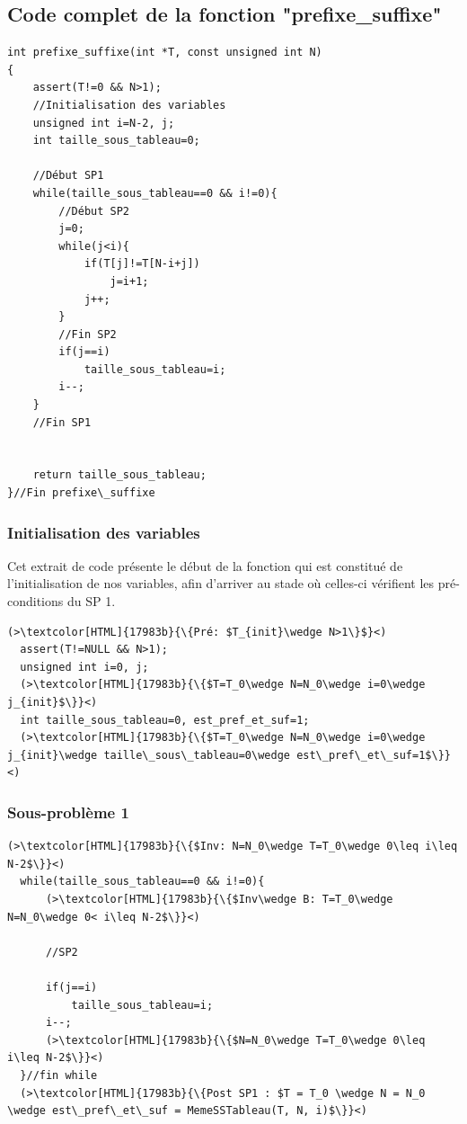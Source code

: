 \documentclass[a4paper, 11pt, oneside]{article}
\begin{document}
\subsection{Code complet de la fonction "prefixe\_suffixe"}
\begin{lstlisting}[caption={Code complet de la fonction "prefixe\_suffixe"}]
 int prefixe_suffixe(int *T, const unsigned int N)
{
    assert(T!=0 && N>1);
    //Initialisation des variables
    unsigned int i=N-2, j;
    int taille_sous_tableau=0;

    //Début SP1
    while(taille_sous_tableau==0 && i!=0){
        //Début SP2
        j=0;
        while(j<i){
            if(T[j]!=T[N-i+j])
                j=i+1;
            j++;
        }
        //Fin SP2
        if(j==i)
            taille_sous_tableau=i;
        i--;
    }
    //Fin SP1


    return taille_sous_tableau;
}//Fin prefixe\_suffixe
\end{lstlisting}

\subsubsection{Initialisation des variables}
Cet extrait de code présente le début de la fonction qui est constitué 
de l'initialisation de nos variables, afin d'arriver au stade où celles-ci vérifient les pré-conditions du SP 1.
\begin{lstlisting}[caption={Initialisation des variables}]
  (>\textcolor[HTML]{17983b}{\{Pré: $T_{init}\wedge N>1\}$}<)
  assert(T!=NULL && N>1);
  unsigned int i=0, j;
  (>\textcolor[HTML]{17983b}{\{$T=T_0\wedge N=N_0\wedge i=0\wedge j_{init}$\}}<)
  int taille_sous_tableau=0, est_pref_et_suf=1;
  (>\textcolor[HTML]{17983b}{\{$T=T_0\wedge N=N_0\wedge i=0\wedge j_{init}\wedge taille\_sous\_tableau=0\wedge est\_pref\_et\_suf=1$\}}<)
\end{lstlisting}

\newpage


\subsubsection{Sous-problème 1}
\begin{lstlisting}[caption={Sous-problème 1}]
  (>\textcolor[HTML]{17983b}{\{$Inv: N=N_0\wedge T=T_0\wedge 0\leq i\leq N-2$\}}<)
  while(taille_sous_tableau==0 && i!=0){
      (>\textcolor[HTML]{17983b}{\{$Inv\wedge B: T=T_0\wedge N=N_0\wedge 0< i\leq N-2$\}}<)

      //SP2

      if(j==i)
          taille_sous_tableau=i;
      i--;
      (>\textcolor[HTML]{17983b}{\{$N=N_0\wedge T=T_0\wedge 0\leq i\leq N-2$\}}<)
  }//fin while
  (>\textcolor[HTML]{17983b}{\{Post SP1 : $T = T_0 \wedge N = N_0 \wedge est\_pref\_et\_suf = MemeSSTableau(T, N, i)$\}}<)
\end{lstlisting}
\end{document}
